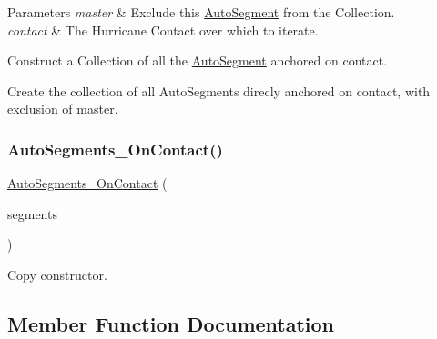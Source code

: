 \begin{DoxyParams}{Parameters}
{\em master} & Exclude this \hyperlink{classKatabatic_1_1AutoSegment}{Auto\+Segment} from the Collection. \\
\hline
{\em contact} & The Hurricane Contact over which to iterate.\\
\hline
\end{DoxyParams}
Construct a Collection of all the \hyperlink{classKatabatic_1_1AutoSegment}{Auto\+Segment} anchored on {\ttfamily contact}.

Create the collection of all Auto\+Segments direcly anchored on {\ttfamily contact}, with exclusion of {\ttfamily master}. \mbox{\label{classKatabatic_1_1AutoSegments__OnContact_ab6ff1773c5335fe496f61f2703a5ac99}} 
\subsubsection{\texorpdfstring{Auto\+Segments\+\_\+\+On\+Contact()}{AutoSegments\_OnContact()}\hspace{0.1cm}{\footnotesize\ttfamily [2/2]}}
{\footnotesize\ttfamily \hyperlink{classKatabatic_1_1AutoSegments__OnContact}{Auto\+Segments\+\_\+\+On\+Contact} (\begin{DoxyParamCaption}\item[{const \hyperlink{classKatabatic_1_1AutoSegments__OnContact}{Auto\+Segments\+\_\+\+On\+Contact} \&}]{segments }\end{DoxyParamCaption})\hspace{0.3cm}{\ttfamily [inline]}}

Copy constructor. 

\subsection{Member Function Documentation}
\mbox{\label{classKatabatic_1_1AutoSegments__OnContact_a5b26b0698bdcb40cbf51b250dfb21858}} 

